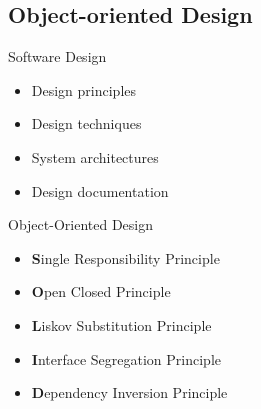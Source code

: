 \documentclass{beamer}
\begin{document}
\subsection{Object-oriented Design}

\begin{frame}[fragile]{Software Design}

\begin{itemize}
\item Design principles
\item Design techniques
\item System architectures
\item Design documentation
\end{itemize}


\end{frame}

\begin{frame}[fragile]{Object-Oriented Design}

\begin{itemize}
\item {\bf S}ingle Responsibility Principle
\item {\bf O}pen Closed Principle
\item {\bf L}iskov Substitution Principle
\item {\bf I}nterface Segregation Principle
\item {\bf D}ependency Inversion Principle
\end{itemize}

\end{frame}
\end{document}

